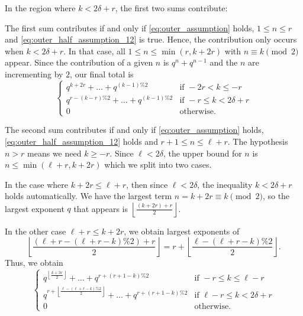 In the region where $k < 2\delta + r$, the first two sums contribute:
\begin{itemize}
  \ii The first sum contributes if and only if \eqref{eq:outer_assumption} holds,
  $1 \le n \le r$ and \eqref{eq:outer_half_assumption_12} is true.
  Hence, the contribution only occurs when $k < 2\delta + r$.
  In that case, all $1 \le n \le \min(r,k+2r)$ with $n \equiv k \pmod 2$ appear.
  Since the contribution of a given $n$ is $q^n + q^{n-1}$
  and the $n$ are incrementing by $2$, our final total is
  \[
    \begin{cases}
      q^{k+2r} + \dots + q^{(k-1)\%2} & \text{if } -2r < k \leq -r \\
      q^{r-(k-r)\%2} + \dots + q^{(k-1)\%2} & \text{if } -r \le k < 2\delta + r \\
      0 & \text{otherwise}.
    \end{cases}
  \]

  \ii The second sum contributes if and only if \eqref{eq:outer_assumption} holds,
  \eqref{eq:outer_half_assumption_12} holds and $r+1 \le n \le \ell + r$.
  The hypothesis $n > r$ means we need $k \geq -r$.
  Since $\ell < 2\delta$, the upper bound for $n$ is $n \le \min(\ell+r, k+2r)$
  which we split into two cases.

  In the case where $k+2r \le \ell+r$, then since $\ell < 2\delta$,
  the inequality $k < 2\delta + r$ holds automatically.
  We have the largest term $n=k+2r \equiv k \pmod 2$,
  so the largest exponent $q$ that appears is
  $\left\lfloor \frac{(k+2r)+r}{2} \right\rfloor$.

  In the other case $\ell+r \le k+2r$,
  we obtain largest exponents of
  \[ \left\lfloor \frac{(\ell+r-(\ell+r-k)\%2) + r}{2} \right\rfloor
    = r + \left\lfloor \frac{\ell-(\ell+r-k)\%2}{2} \right\rfloor.
  \]
  Thus, we obtain
  \[
    \begin{cases}
      q^{\left\lfloor \frac{k+3r}{2} \right\rfloor} + \dots + q^{r+(r+1-k)\%2}
        & \text{if } -r \le k \le \ell - r \\
      q^{r + \left\lfloor \frac{\ell-(\ell+r-k)\%2}{2} \right\rfloor}
        + \dots + q^{r + (r+1-k)\%2}
        & \text{if } \ell - r \leq k < 2\delta + r \\
      0 & \text{otherwise}.
    \end{cases}
  \]
\end{itemize}

